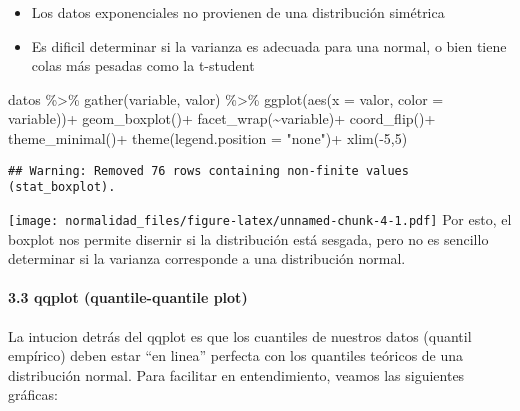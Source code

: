 \documentclass[
]{article}
\newenvironment{Shaded}{\begin{snugshade}}{\end{snugshade}}
\newcommand{\AttributeTok}[1]{\textcolor[rgb]{0.77,0.63,0.00}{#1}}
\newcommand{\DecValTok}[1]{\textcolor[rgb]{0.00,0.00,0.81}{#1}}
\newcommand{\FunctionTok}[1]{\textcolor[rgb]{0.00,0.00,0.00}{#1}}
\newcommand{\NormalTok}[1]{#1}
\newcommand{\SpecialCharTok}[1]{\textcolor[rgb]{0.00,0.00,0.00}{#1}}
\newcommand{\StringTok}[1]{\textcolor[rgb]{0.31,0.60,0.02}{#1}}
\providecommand{\tightlist}{%
  \setlength{\itemsep}{0pt}\setlength{\parskip}{0pt}}
\begin{document}
\begin{itemize}
\tightlist
\item
  Los datos exponenciales no provienen de una distribución simétrica
\item
  Es dificil determinar si la varianza es adecuada para una normal, o
  bien tiene colas más pesadas como la t-student
\end{itemize}

\begin{Shaded}
\begin{Highlighting}[]
\NormalTok{datos }\SpecialCharTok{\%\textgreater{}\%} 
  \FunctionTok{gather}\NormalTok{(variable, valor) }\SpecialCharTok{\%\textgreater{}\%} 
  \FunctionTok{ggplot}\NormalTok{(}\FunctionTok{aes}\NormalTok{(}\AttributeTok{x =}\NormalTok{ valor, }\AttributeTok{color =}\NormalTok{ variable))}\SpecialCharTok{+}
  \FunctionTok{geom\_boxplot}\NormalTok{()}\SpecialCharTok{+}
  \FunctionTok{facet\_wrap}\NormalTok{(}\SpecialCharTok{\textasciitilde{}}\NormalTok{variable)}\SpecialCharTok{+}
  \FunctionTok{coord\_flip}\NormalTok{()}\SpecialCharTok{+}
  \FunctionTok{theme\_minimal}\NormalTok{()}\SpecialCharTok{+}
  \FunctionTok{theme}\NormalTok{(}\AttributeTok{legend.position =} \StringTok{"none"}\NormalTok{)}\SpecialCharTok{+}
  \FunctionTok{xlim}\NormalTok{(}\SpecialCharTok{{-}}\DecValTok{5}\NormalTok{,}\DecValTok{5}\NormalTok{)}
\end{Highlighting}
\end{Shaded}

\begin{verbatim}
## Warning: Removed 76 rows containing non-finite values (stat_boxplot).
\end{verbatim}

\texttt{[image: normalidad\_files/figure-latex/unnamed-chunk-4-1.pdf]}
Por esto, el boxplot nos permite disernir si la distribución está
sesgada, pero no es sencillo determinar si la varianza corresponde a una
distribución normal.

\hypertarget{qqplot-quantile-quantile-plot}{%
\paragraph{3.3 qqplot (quantile-quantile
plot)}\label{qqplot-quantile-quantile-plot}}

La intucion detrás del qqplot es que los cuantiles de nuestros datos
(quantil empírico) deben estar ``en linea'' perfecta con los quantiles
teóricos de una distribución normal. Para facilitar en entendimiento,
veamos las siguientes gráficas:
\end{document}
